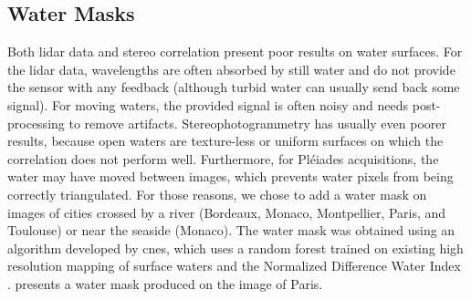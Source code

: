 \subsection{Water Masks}
Both \acrshort{lidar} data and stereo correlation present poor results on water surfaces. For the \acrshort{lidar} data, wavelengths are often absorbed by still water and do not provide the sensor with any feedback (although turbid water can usually send back some signal). For moving waters, the provided signal is often noisy and needs post-processing to remove artifacts. Stereophotogrammetry has usually even poorer results, because open waters are texture-less or uniform surfaces on which the correlation does not perform well. Furthermore, for Pléiades acquisitions, the water may have moved between images, which prevents water pixels from being correctly triangulated. For those reasons, we chose to add a water mask on images of cities crossed by a river (Bordeaux, Monaco, Montpellier, Paris, and Toulouse) or near the seaside (Monaco). The water mask was obtained using an algorithm developed by \acrshort{cnes}, which uses a random forest trained on existing high resolution mapping of surface waters \cite{pekel_high-resolution_2016} and the Normalized Difference Water Index \cite{gao_ndwinormalized_1996}.  presents a water mask produced on the image of Paris.

